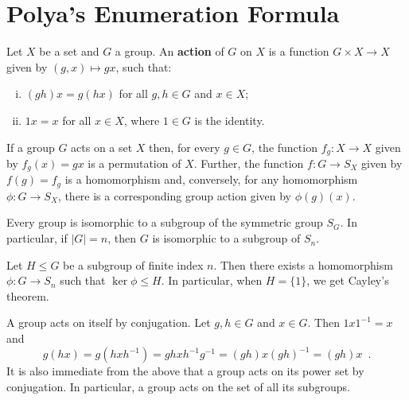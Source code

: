 \chapter{Polya's Enumeration Formula}

\begin{definition}
	\cite[99]{Rotman1967}
	\cite[41]{DummitFoote2004}
	Let $X$ be a set and $G$ a group. An \textbf{action} of $G$ on $X$ is a function
	$G \times X \to X$ given by $(g, x) \mapsto gx$, such that:
	\begin{enumerate}[i.]
		\item $(gh)x = g(hx)$ for all $g, h \in G$ and $x \in X$;
		\item $1x = x$ for all $x \in X$, where $1 \in G$ is the identity.
	\end{enumerate}
\end{definition}

\begin{proposition}
	\cite[99]{Rotman1967}
	\cite[42]{DummitFoote2004}
	If a group $G$ acts on a set $X$ then, for every $g \in G$, the function
	$f_g : X \to X$ given by $f_g(x) = gx$ is a permutation of $X$. Further, the function
	$f : G \to S_X$ given by $f(g) = f_g$ is a homomorphism and, conversely, for any
	homomorphism $\phi : G \to S_X$, there is a corresponding group action given by
	$\phi(g)(x)$.
\end{proposition}

\begin{theorem}[Cayley]
	\cite[96]{Rotman1967}
	\cite[120]{DummitFoote2004}
	Every group is isomorphic to a subgroup of the symmetric group $S_G$. In particular,
	if $|G| = n$, then $G$ is isomorphic to a subgroup of $S_n$.
\end{theorem}

\begin{theorem}
	\cite[97]{Rotman1967}
	Let $H \leq G$ be a subgroup of finite index $n$. Then there exists a homomorphism
	$\phi : G \to S_n$ such that $\ker \phi \leq H$. In particular, when $H = \{ 1 \}$,
	we get Cayley's theorem.
\end{theorem}

\begin{example}
	\cite[122]{DummitFoote2004}
	A group acts on itself by conjugation. Let $g, h \in G$ and $x \in G$. Then
	$1 x 1^{-1} = x$ and
	\begin{equation}
		g(hx) = g(h x h^{-1}) = gh x h^{-1}g^{-1} = (gh) x (gh)^{-1} = (gh)x \enspace.
	\end{equation}
	It is also immediate from the above that a group acts on its power set by conjugation.
	In particular, a group acts on the set of all its subgroups.
\end{example}

